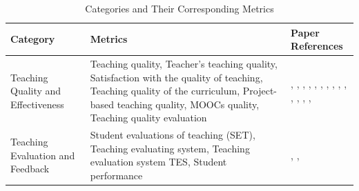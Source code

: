 \documentclass{svproc}
\begin{document}
\begin{table}
\centering
\caption{Categories and Their Corresponding Metrics}
\label{Categories metrics}
\begin{tabular}{|p{}|p{}|p{}|}
\hline
\textbf{Category} & \textbf{Metrics} & \textbf{Paper References} \\ \hline
Teaching Quality and Effectiveness & Teaching quality, Teacher's teaching quality, Satisfaction with the quality of teaching, Teaching quality of the curriculum, Project-based teaching quality, MOOCs quality, Teaching quality evaluation & 
\cite{Competition_Neural_Network_Model_Application_in_the_Bilingual_Teaching_Quality_Evaluation_of_Universities},
\cite{Visualizing_Student_Opinion_Through_Text_Analysis}\cite{Improving_MOOC_quality_using_learning_analytics_and_tools},
\cite{Research_on_the_Application_of_BP_Neural_Network_in_Vocal_Music_Teaching_Quality_Evaluation}, \cite{Evaluating_the_quality_of_teaching_in_higher_education_institutes_using_clustering_approach_and_set_pair_analysis}, \cite{An_Improved_BP_Neural_Network-Based_Quality_Evaluation_Model_for_Chinese_International_Education_Teaching_Courses}, \cite{Research_on_Project-Based_Teaching_Quality_Evaluation_Based_on_Fuzzy_Cluster_Analysis}, \cite{Improving_MOOC_quality_using_learning_analytics_and_tools}, \cite{Online_reviews_evaluation_system_for_higher_education_institution:_An_aspect_based_sentiment_analysis_tool}, \cite{Automatic_Rules_Generation_for_Teaching_Strategies_Improvement}, \cite{Analyzing_educational_comments_for_topics_and_sentiments:_A_text_analytics_approach}, \cite{An_Evaluation_Model_of_Moral_Education_Teaching_Quality_in_Universities_Based_on_System_Control_Theory}, \cite{Research_on_the_Application_of_BP_Neural_Network_in_the_Evaluation_of_College_Teaching_Quality}, 
\cite{The_Evaluation_and_Application_of_BP_Neural_Network_in_the_Multiple_Quality_Assurance_Paths_of_Higher_Education},
\cite{Research_on_Evaluation_of_Online_Teaching_Effect_based_on_Deep_Learning_Technology},
\cite{The_Evaluation_and_Application_of_BP_Neural_Network_in_the_Multiple_Quality_Assurance_Paths_of_Higher_Education} \\ \hline
Teaching Evaluation and Feedback & Student evaluations of teaching (SET), Teaching evaluating system, Teaching evaluation system TES, Student performance & 
\cite{Palaute:_An_Online_Text_Mining_Tool_for_Analyzing_Written_Student_Course_Feedback}
, \cite{Romanov}
\cite{Evaluation_System_of_Tourism_Psychology_Teaching_Quality_Based_on_Convolutional_Neural_Network},
\cite{Personalized_Learning_Model_based_on_Deep_Learning_Algorithm_for_Student_Behaviour_Analytic} \\ \hline

\end{tabular}
\end{table}
\end{document}
